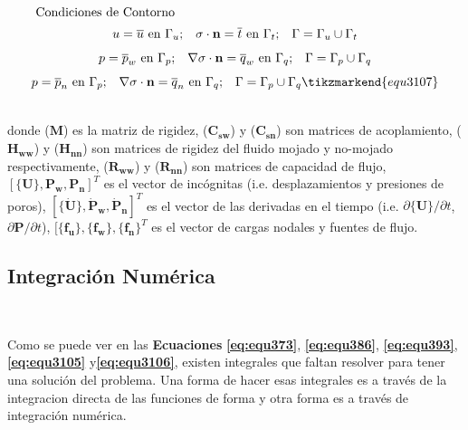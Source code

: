 \begin{ceqn}
\begin{subequations}
\begin{gather}
\shortintertext{   Condiciones de Contorno} 
u = \overline{u}\ \text{en}\ \Gamma_u \text{;}\quad \mathbf{\sigma} \cdot \mathbf{n} = \overline{t}\ \text{en}\ \Gamma_t \text{;}\quad \Gamma = \Gamma_u \cup \Gamma_t \label{eq:equ3107b}\\[4pt]
p = \overline{p}_w\ \text{en}\ \Gamma_p \text{;}\quad  \nabla\mathbf{\sigma} \cdot \mathbf{n} = \overline{q}_w\ \text{en}\ \Gamma_q \text{;}\quad \Gamma = \Gamma_p \cup \Gamma_q \label{eq:equ3107c}\\[4pt]
p = \overline{p}_n\ \text{en}\ \Gamma_p \text{;}\quad  \nabla\mathbf{\sigma} \cdot \mathbf{n} = \overline{q}_n\ \text{en}\ \Gamma_q \text{;}\quad \Gamma = \Gamma_p \cup \Gamma_q \label{eq:equ3107d}
\tikzmarkend{equ3107}
\end{gather}
\end{subequations}
\end{ceqn}
\\
donde ($\mathbf{M}$) es la matriz de rigidez, ($\mathbf{C_{sw}}$) y ($\mathbf{C_{sn}}$) son matrices de acoplamiento, ($\mathbf{H_{ww}}$) y ($\mathbf{H_{nn}}$) son matrices de rigidez del fluido mojado y no-mojado respectivamente, ($\mathbf{R_{ww}}$) y ($\mathbf{R_{nn}}$) son matrices de capacidad de flujo,  $[\{\mathbf{U}\}, \mathbf{P_w}, \mathbf{P_n} ]^T$ es el vector de incógnitas (i.e. desplazamientos y presiones de poros),  $[\{\mathbf{\dot{U}}\},\mathbf{\dot{P}_w},\mathbf{\dot{P}_n}]^T$ es el vector de las derivadas en el tiempo (i.e. $\partial \{\mathbf{U}\}/\partial t$, $\partial \mathbf{P}/\partial t$), $[\{\mathbf{f_u}\}, \{\mathbf{f_w}\}, \{\mathbf{f_n}\}^T$ es el vector de cargas nodales y fuentes de flujo.


\vspace{1cm}
\subsection{Integración Numérica}~\hypertarget{sec:sec342}{}
\label{sec:sec342}

Como se puede ver en las \textbf{Ecuaciones} \textbf{\ref{eq:equ373}}, \textbf{\ref{eq:equ386}}, \textbf{\ref{eq:equ393}}, \textbf{\ref{eq:equ3105}} y\textbf{\ref{eq:equ3106}}, existen integrales que faltan resolver para tener una solución del problema. Una forma de hacer esas integrales es a través de la integracion directa de las funciones de forma y otra forma es a través de integración numérica.\bigskip

